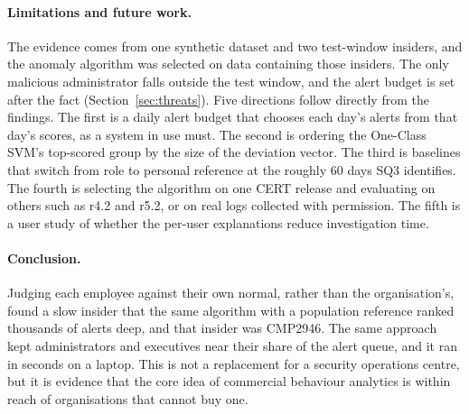 \documentclass[a4paper,12pt]{article}
\begin{document}
\paragraph{Limitations and future work.} The evidence comes from one synthetic dataset and two test-window insiders, and the anomaly algorithm was selected on data containing those insiders. The only malicious administrator falls outside the test window, and the alert budget is set after the fact (Section~\ref{sec:threats}). Five directions follow directly from the findings. The first is a daily alert budget that chooses each day's alerts from that day's scores, as a system in use must. The second is ordering the One-Class SVM's top-scored group by the size of the deviation vector. The third is baselines that switch from role to personal reference at the roughly 60 days SQ3 identifies. The fourth is selecting the algorithm on one CERT release and evaluating on others such as r4.2 and r5.2, or on real logs collected with permission. The fifth is a user study of whether the per-user explanations reduce investigation time.

\paragraph{Conclusion.} Judging each employee against their own normal, rather than the organisation's, found a slow insider that the same algorithm with a population reference ranked thousands of alerts deep, and that insider was CMP2946. The same approach kept administrators and executives near their share of the alert queue, and it ran in seconds on a laptop. This is not a replacement for a security operations centre, but it is evidence that the core idea of commercial behaviour analytics is within reach of organisations that cannot buy one.

\let\oldthebibliography\thebibliography
\renewcommand{\thebibliography}[1]{\oldthebibliography{#1}\setlength{\itemsep}{0pt}\setlength{\parsep}{0pt}}


\end{document}
